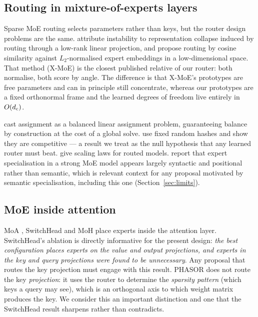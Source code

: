 \subsection{Routing in mixture-of-experts layers}

Sparse MoE routing \citep{shazeer2017outrageously,fedus2022switch,lepikhin2021gshard} selects parameters rather than keys, but the router design problems are the same. \citet{chi2022representation} attribute instability to representation collapse induced by routing through a low-rank linear projection, and propose routing by cosine similarity against $L_2$-normalised expert embeddings in a low-dimensional space. That method (X-MoE) is the closest published relative of our router: both normalise, both score by angle. The difference is that X-MoE's prototypes are free parameters and can in principle still concentrate, whereas our prototypes are a fixed orthonormal frame and the learned degrees of freedom live entirely in $O(d_{\mathrm{c}})$.

\citet{lewis2021base} cast assignment as a balanced linear assignment problem, guaranteeing balance by construction at the cost of a global solve. \citet{roller2021hash} use fixed random hashes and show they are competitive --- a result we treat as the null hypothesis that any learned router must beat. \citet{clark2022unified} give scaling laws for routed models. \citet{jiang2024mixtral} report that expert specialisation in a strong MoE model appears largely syntactic and positional rather than semantic, which is relevant context for any proposal motivated by semantic specialisation, including this one (Section~\ref{sec:limits}).

\subsection{MoE inside attention}

MoA \citep{zhang2022moa}, SwitchHead \citep{csordas2024switchhead} and MoH \citep{jin2025moh} place experts inside the attention layer. SwitchHead's ablation is directly informative for the present design: \emph{the best configuration places experts on the value and output projections, and experts in the key and query projections were found to be unnecessary}. Any proposal that routes the key projection must engage with this result. PHASOR does not route the key \emph{projection}: it uses the router to determine the \emph{sparsity pattern} (which keys a query may see), which is an orthogonal axis to which weight matrix produces the key. We consider this an important distinction and one that the SwitchHead result sharpens rather than contradicts.

